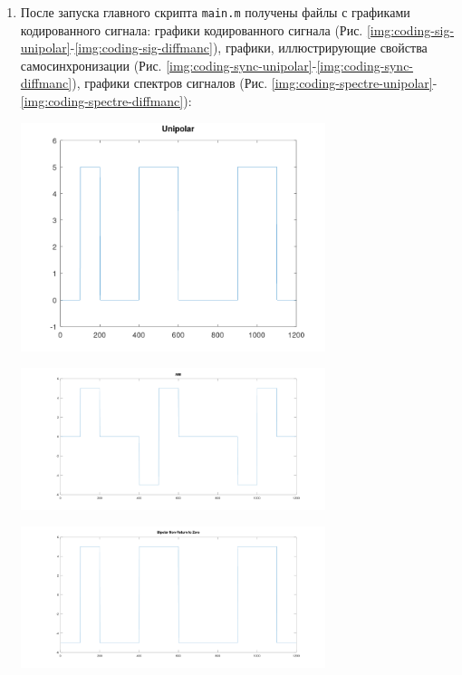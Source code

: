 \begin{enumerate}
    \item После запуска главного скрипта \texttt{main.m} получены файлы с графиками
        кодированного сигнала: графики кодированного сигнала
        (Рис. \ref{img:coding-sig-unipolar}-\ref{img:coding-sig-diffmanc}),
        графики, иллюстрирующие свойства самосинхронизации
        (Рис. \ref{img:coding-sync-unipolar}-\ref{img:coding-sync-diffmanc}),
        графики спектров сигналов
        (Рис. \ref{img:coding-spectre-unipolar}-\ref{img:coding-spectre-diffmanc}):
        \begin{center}
            \centering
            \includegraphics[width=0.7\textwidth]{../octave/coding/signal/unipolar.png}
            \label{img:coding-sig-unipolar}
        \end{center}
        \begin{center}
            \centering
            \includegraphics[width=0.7\textwidth]{../octave/coding/signal/ami.png}
            \label{img:coding-sig-ami}
        \end{center}
        \begin{center}
            \centering
            \includegraphics[width=0.7\textwidth]{../octave/coding/signal/bipolarnrz.png}

\end{center}
\end{enumerate}
